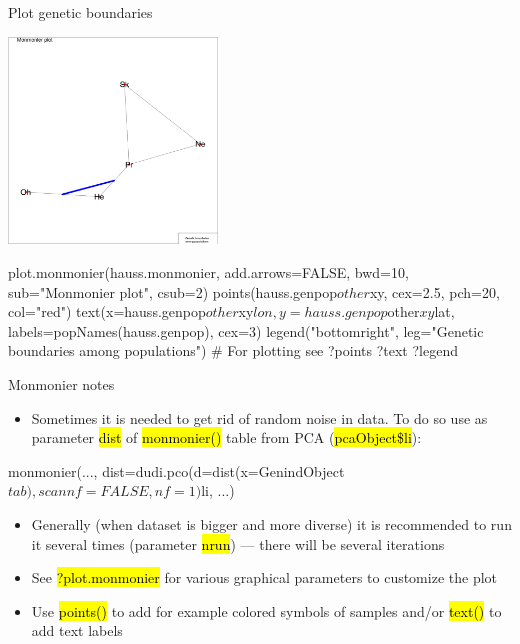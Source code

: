 \documentclass[compress, ucs, xelatex, 11pt, xcolor=svgnames,
	hyperref={
		bookmarks=true,
		unicode=true,
		colorlinks=true,
		pdftitle={Molecular data in R},
		plainpages=false,
		pdfauthor={Vojtech Zeisek},
		pdfsubject={Course about phylogeny and evolution in R},
		pdfcreator={XeLaTeX},
		pdfkeywords={R, evolution, phylogeny, molecular data},
		linkcolor=Tomato,
		anchorcolor=SaddleBrown,
		citecolor=Goldenrod,
		filecolor=DarkMagenta,
		menucolor=Sienna,
		urlcolor=DarkTurquoise,
		pdftex},
	url={hyphens, lowtilde} %
	]{beamer}
\renewcommand{\texttt}[1]{\hl{\ttfamily #1}}
\begin{document}
\begin{frame}[fragile]{Plot genetic boundaries}
	\begin{multicols}{2}
		\includegraphics[height=5.5cm]{monmonier.png}
		\begin{spluscode}
    plot.monmonier(hauss.monmonier,
      add.arrows=FALSE, bwd=10,
      sub="Monmonier plot", csub=2)
    points(hauss.genpop$other$xy,
      cex=2.5, pch=20, col="red")
    text(x=hauss.genpop$other$xy$lon,
      y=hauss.genpop$other$xy$lat,
      labels=popNames(hauss.genpop),
      cex=3)
    legend("bottomright",
      leg="Genetic boundaries\n
      among populations")
    # For plotting see
    ?points
    ?text
    ?legend
		\end{spluscode}
	\end{multicols}
\end{frame}

\begin{frame}[fragile]{Monmonier notes}
	\begin{itemize}
		\item Sometimes it is needed to get rid of random noise in data. To do so use as parameter \texttt{dist} of \texttt{monmonier()} table from PCA (\texttt{pcaObject\$li}):
	\end{itemize}
	\begin{spluscode}
    monmonier(..., dist=dudi.pco(d=dist(x=GenindObject$tab),
      scannf=FALSE, nf=1)$li, ...)
	\end{spluscode}
	\begin{itemize}
		\item Generally (when dataset is bigger and more diverse) it is recommended to run it several times (parameter \texttt{nrun}) --- there will be several iterations
		\item See \texttt{?plot.monmonier} for various graphical parameters to customize the plot
		\item Use \texttt{points()} to add for example colored symbols of samples and/or \texttt{text()} to add text labels
	\end{itemize}
\end{frame}
\end{document}
